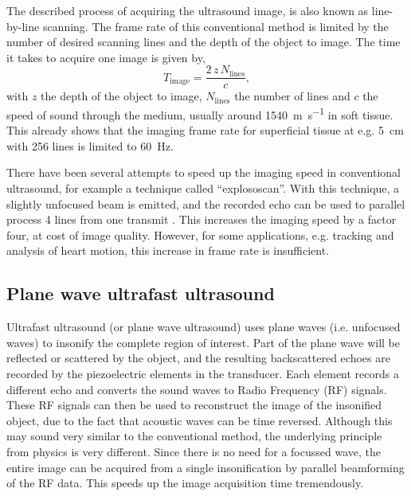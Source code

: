 The described process of acquiring the ultrasound image, is also known as line-by-line scanning. The frame rate of this conventional method is limited by the number of desired scanning lines and the depth of the object to image. The time it takes to acquire one image is given by,
\begin{equation}
    T_\text{image} = \frac{2 \, z \, N_\text{lines}}{c},
\end{equation}
with $z$ the depth of the object to image, $N_\text{lines}$ the number of lines and $c$ the speed of sound through the medium, usually around \SI{1540}{\meter\per\second} in soft tissue. This already shows that the imaging frame rate for superficial tissue at e.g. \SI{5}{\centi\meter} with 256 lines is limited to \SI{60}{\hertz}. 

There have been several attempts to speed up the imaging speed in conventional ultrasound, for example a technique called ``explososcan''. With this technique, a slightly unfocused beam is emitted, and the recorded echo can be used to parallel process 4 lines from one transmit \cite{shattuck_explososcan_1984}. This increases the imaging speed by a factor four, at cost of image quality. However, for some applications, e.g. tracking and analysis of heart motion, this increase in frame rate is insufficient. 




\subsection{Plane wave ultrafast ultrasound}
Ultrafast ultrasound (or plane wave ultrasound) uses plane waves (i.e. unfocused waves) to insonify the complete region of interest. Part of the plane wave will be reflected or scattered by the object, and the resulting backscattered echoes are recorded by the piezoelectric elements in the transducer. Each element records a different echo and converts the sound waves to Radio Frequency (RF) signals. These RF signals can then be used to reconstruct the image of the insonified object, due to the fact that acoustic waves can be time reversed. Although this may sound very similar to the conventional method, the underlying principle from physics is very different. Since there is no need for a focussed wave, the entire image can be acquired from a single insonification by parallel beamforming of the RF data. This speeds up the image acquisition time tremendously. 

